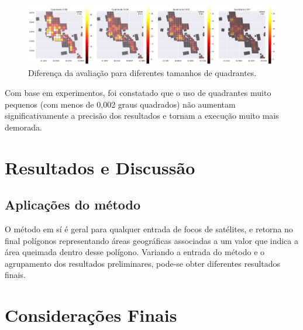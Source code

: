 \documentclass[cic,tc]{iiufrgs}
\begin{document}
\begin{figure}[H]
    \caption{Diferença da avaliação para diferentes tamanhos de quadrantes.}
    \begin{center}
        \includegraphics[width=35em]{diferenca_entre_quadrantes}
    \end{center}
    \label{fig:diferenca_entre_quadrantes}
\end{figure}

Com base em experimentos, foi constatado que o uso de quadrantes muito pequenos (com menos de 0,002 graus quadrados) não aumentam significativamente a precisão dos resultados e tornam a execução muito mais demorada.




\chapter{Resultados e Discussão}
\label{chp:resultados_discussão}

\section{Aplicações do método}

O método em sí é geral para qualquer entrada de focos de satélites, e retorna no final polígonos representando áreas geográficas associadas a um valor que indica a área queimada dentro desse polígono. Variando a entrada do método e o agrupamento dos resultados preliminares, pode-se obter diferentes resultados finais. \par



\chapter{Considerações Finais}





\end{document}
